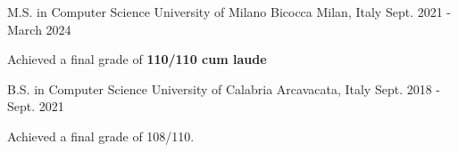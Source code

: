 

\begin{cventries}

\cventry
    {M.S. in Computer Science} %
    {University of Milano Bicocca} %
    {Milan, Italy} %
    {Sept. 2021 - March 2024} %
    {
      \begin{cvitems} %
        \item Achieved a final grade of \textbf{110/110 cum laude}
      \end{cvitems}
    }
    
\cventry
    {B.S. in Computer Science} %
    {University of Calabria} %
    {Arcavacata, Italy} %
    {Sept. 2018 - Sept. 2021} %
    {
      \begin{cvitems} %
        \item Achieved a final grade of 108/110.
      \end{cvitems}
    }
    

\end{cventries}
